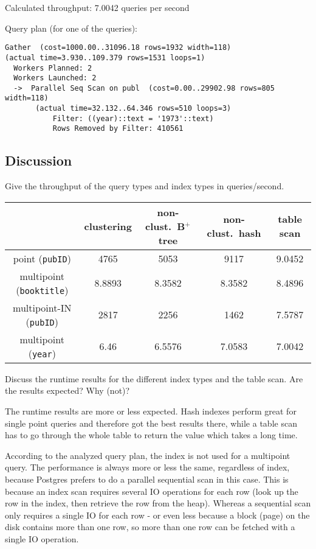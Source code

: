\documentclass[11pt]{scrartcl}
\begin{document}
Calculated throughput: 7.0042 queries per second

Query plan (for one of the queries):

{\small
\parskip0pt\begin{verbatim}
Gather  (cost=1000.00..31096.18 rows=1932 width=118) 
(actual time=3.930..109.379 rows=1531 loops=1)
  Workers Planned: 2
  Workers Launched: 2
  ->  Parallel Seq Scan on publ  (cost=0.00..29902.98 rows=805 width=118) 
       (actual time=32.132..64.346 rows=510 loops=3)
           Filter: ((year)::text = '1973'::text)
           Rows Removed by Filter: 410561
\end{verbatim}}

\subsection*{Discussion}

Give the throughput of the query types and index types in queries/second.
\begin{table}[H]
  \centering
  \begin{tabular}{c|c|c|c|c}
    & clustering & non-clust.\ B$^+$ tree & non-clust.\ hash & table scan
      \tabularnewline
    \hline
    point (\texttt{pubID}) & 4765 & 5053 & 9117 & 9.0452 \tabularnewline
    \hline
    multipoint (\texttt{booktitle}) & 8.8893 & 8.3582 & 8.3582 & 8.4896
      \tabularnewline
    \hline
		multipoint-IN (\texttt{pubID}) & 2817 & 2256 & 1462 & 7.5787
      \tabularnewline
		\hline
    multipoint (\texttt{year}) & 6.46 & 6.5576 & 7.0583 & 7.0042
      \tabularnewline
  \end{tabular}
\end{table}

Discuss the runtime results for the different index types and the table scan. Are the results expected? Why (not)?

The runtime results are more or less expected. Hash indexes perform great for single point queries and therefore got the best results there, while a table scan has to go through the whole table to return the value which takes a long time.

According to the analyzed query plan, the index is not used for a multipoint query. The performance is always more or less the same, regardless of index, because Postgres prefers to do a parallel sequential scan in this case. This is because an index scan requires several IO operations for each row (look up the row in the 	index, then retrieve the row from the heap). Whereas a sequential scan only requires a single IO for each row - or even less because a block (page) on the disk contains more than one row, so more than one row can be fetched with a single IO operation.
\end{document}
